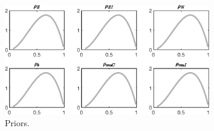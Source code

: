 \begin{figure}[H]
\centering
\includegraphics[width=0.80\textwidth]{BRS_sectoral_KK/graphs/BRS_sectoral_KK_Priors4}
\caption{Priors.}\label{Fig:Priors:4}
\end{figure}
 

